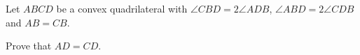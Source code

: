 Let $ABCD$ be a convex quadrilateral with $\angle CBD = 2 \angle ADB$,  $\angle ABD = 2 \angle CDB$ and  $AB = CB$.

Prove that $AD = CD$.